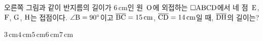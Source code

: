 \noindent\begin{minipage}[t]{0.58\linewidth}\vspace{0pt}\raggedright 오른쪽 그림과 같이 반지름의 길이가 $6\,\mathrm{cm}$인 원~$\mathrm{O}$에 외접하는 $\square\mathrm{ABCD}$에서 네 점~$\mathrm{E}$, $\mathrm{F}$, $\mathrm{G}$, $\mathrm{H}$는 접점이다. $\angle\mathrm{B}=90^\circ$이고 $\overline{\mathrm{BC}}=15\,\mathrm{cm}$, $\overline{\mathrm{CD}}=14\,\mathrm{cm}$일 때, $\overline{\mathrm{DH}}$의 길이는?\end{minipage}\hfill\begin{minipage}[t]{0.4\linewidth}\vspace{0pt}\centering \resizebox{\ifdim\width>\linewidth\linewidth\else\width\fi}{!}{}\end{minipage}\par
\begin{choices32}{$3\,\mathrm{cm}$}{$4\,\mathrm{cm}$}{$5\,\mathrm{cm}$}{$6\,\mathrm{cm}$}{$7\,\mathrm{cm}$}\end{choices32}

